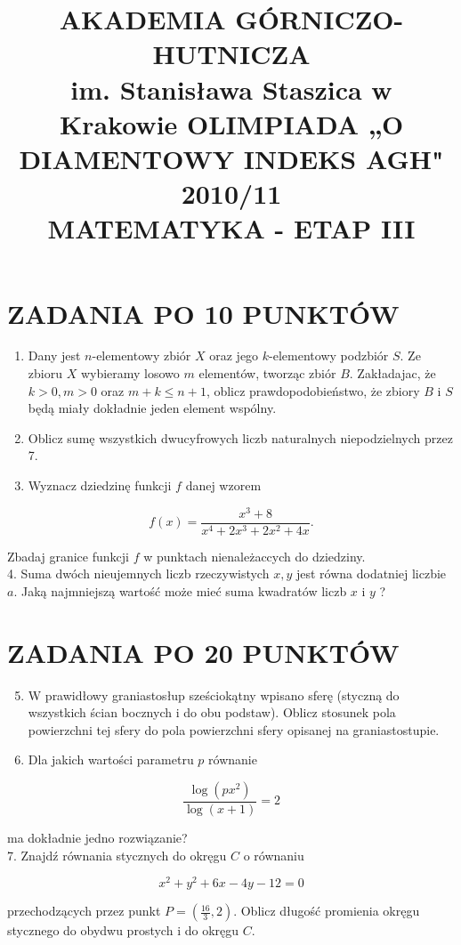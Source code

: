 \documentclass[10pt]{article}
\title{AKADEMIA GÓRNICZO-HUTNICZA \\
 im. Stanisława Staszica w Krakowie OLIMPIADA „O DIAMENTOWY INDEKS AGH" 2010/11 \\
 MATEMATYKA - ETAP III }
\author{}
\date{}
\begin{document}
\maketitle
\section*{ZADANIA PO 10 PUNKTÓW}
\begin{enumerate}
  \item Dany jest $n$-elementowy zbiór $X$ oraz jego $k$-elementowy podzbiór $S$. Ze zbioru $X$ wybieramy losowo $m$ elementów, tworząc zbiór $B$. Zakładajac, że $k>0, m>0$ oraz $m+k \leq n+1$, oblicz prawdopodobieństwo, że zbiory $B$ i $S$ będą miały dokładnie jeden element wspólny.
  \item Oblicz sumę wszystkich dwucyfrowych liczb naturalnych niepodzielnych przez 7.
  \item Wyznacz dziedzinę funkcji $f$ danej wzorem
\end{enumerate}

$$
f(x)=\frac{x^{3}+8}{x^{4}+2 x^{3}+2 x^{2}+4 x} .
$$

Zbadaj granice funkcji $f$ w punktach nienależaccych do dziedziny.\\
4. Suma dwóch nieujemnych liczb rzeczywistych $x, y$ jest równa dodatniej liczbie $a$. Jaką najmniejszą wartość może mieć suma kwadratów liczb $x$ i $y$ ?

\section*{ZADANIA PO 20 PUNKTÓW}
\begin{enumerate}
  \setcounter{enumi}{4}
  \item W prawidłowy graniastosłup sześciokątny wpisano sferę (styczną do wszystkich ścian bocznych i do obu podstaw). Oblicz stosunek pola powierzchni tej sfery do pola powierzchni sfery opisanej na graniastostupie.
  \item Dla jakich wartości parametru $p$ równanie
\end{enumerate}

$$
\frac{\log \left(p x^{2}\right)}{\log (x+1)}=2
$$

ma dokładnie jedno rozwiązanie?\\
7. Znajdź równania stycznych do okręgu $C$ o równaniu

$$
x^{2}+y^{2}+6 x-4 y-12=0
$$

przechodzących przez punkt $P=\left(\frac{16}{3}, 2\right)$. Oblicz długość promienia okręgu stycznego do obydwu prostych i do okręgu $C$.
\end{document}
